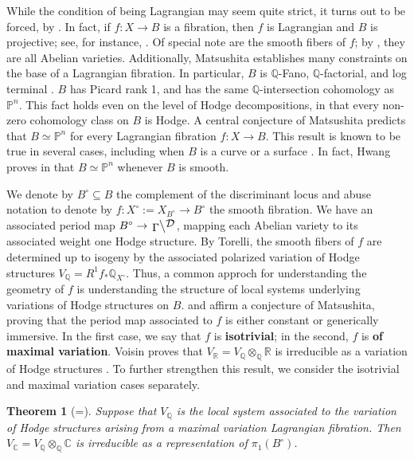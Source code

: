 \documentclass[12pt]{amsart}
\newcommand{\R}{\mathbb{R}}
\newcommand{\Q}{\mathbb{Q}}
\newcommand{\C}{\mathbb{C}}
\newcommand{\leftQ}[2]{\left.\raisebox{-.2em}{$#2$}\middle\backslash\raisebox{.2em}{$#1$}\right.}
\newtheorem{theorem}{Theorem}[section]
\theoremstyle{definition}
\theoremstyle{remark}
\numberwithin{equation}{section}
\begin{document}
While the condition of being Lagrangian may seem quite strict, it turns out to be 
forced, by \cite{mats99}. In fact, if \(f: X \to B\) is a fibration, then
\(f\) is Lagrangian and \(B\) is projective; see, for instance,
\cite[Proposition 2.2]{greb-lenh14}. Of special note 
are the smooth fibers of \(f\); by \cite{mats99}, they are all Abelian varieties.
Additionally, Matsushita establishes many constraints on the base of a Lagrangian 
fibration. In particular, \(B\) is \(\Q\)-Fano, \(\Q\)-factorial, and log terminal
\cite{mats15}. \(B\) has Picard rank 1, and has the same 
\(\Q\)-intersection cohomology as \(\mathbb{P}^n\). This fact holds even on the 
level of Hodge decompositions, in that every non-zero cohomology class on \(B\)
is Hodge. A central conjecture of Matsushita predicts that \(B \simeq \mathbb{P}^n\) for every
Lagrangian fibration \(f: X \to B\). This result is known to be true in several cases,
including when \(B\) is a curve or a surface \cite{huy-xu22}. In fact, Hwang proves
in \cite{hwa08} that \(B \simeq \mathbb{P}^n\) whenever \(B\) is smooth.

We denote by \(B^\circ \subseteq B\) the complement of the discriminant locus and 
abuse notation to denote by \(f: X^\circ := X_{B^\circ} \to B^\circ\) the smooth 
fibration. We have an associated
period map \(B^\circ \to \leftQ{\mathcal{D}}{\Gamma}\), mapping each Abelian variety
to its associated weight one Hodge structure. By Torelli, the smooth fibers of \(f\)
are determined up to isogeny by the associated polarized variation of Hodge structures
\(V_\Q = R^1 f_* \Q_{X^\circ}\). Thus, a common approch for understanding the geometry
of \(f\) is understanding the structure of local systems underlying variations of 
Hodge structures on \(B\). \cite{geeman-voisin16} and \cite{bak22} affirm a conjecture
of Matsushita, proving that the period map
associated to \(f\) is either constant or generically immersive. In the first case,
we say that \(f\) is \textbf{isotrivial}; in the second, \(f\) is
\textbf{of maximal variation}. Voisin proves that \(V_\R = V_\Q \otimes_\Q \R\) is
irreducible as a variation of Hodge structures \cite{vois18}. To further strengthen
this result, we consider the isotrivial and maximal variation cases separately.

\begin{theorem}[=]
    Suppose that \(V_\Q\) is the local system associated to the variation of Hodge
    structures arising from a maximal variation Lagrangian fibration. Then
    \(V_\C = V_\Q \otimes_\Q \C\) is irreducible as a representation of
    \(\pi_1(B^\circ)\).
\end{theorem}
\end{document}
